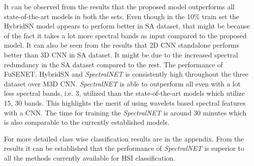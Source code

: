 \documentclass[journal]{IEEEtran}
\begin{document}
It can be observed from the results that the proposed model outperforms all state-of-the-art models in both the sets. Even though in the 10\% train set the HybridSN model appears to perform better in SA dataset, that might be because of the fact it takes a lot more spectral bands as input compared to the proposed model. It can also be seen from the results that 2D CNN standalone performs better than 3D CNN in SA dataset. It might be due to the increased spectral redundancy in the SA dataset compared to the rest. The performance of FuSENET, HybridSN and \textit{SpectralNET} is consistently high throughout the three dataset over M3D CNN. \textit{SpectralNET} is able to outperform all even with a lot less spectral bands, i.e. 3, utilized than the state-of-the-art models which utilize 15, 30 bands. This highlights the merit of using wavelets based spectral features with a CNN. The time for training the \textit{SpectralNET} is around 30 minutes which is also comparable to the currently established models. 

For more detailed class wise classification results are in the appendix. From the results it can be established that the performance of \textit{SpectralNET} is superior to all the methods currently available for HSI classification. 
\end{document}
